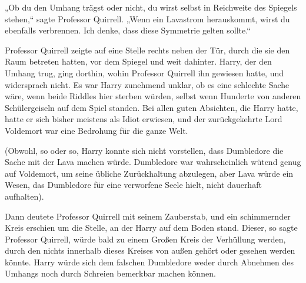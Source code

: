„Ob du den Umhang trägst oder nicht, du wirst selbst in Reichweite des Spiegels stehen,“ sagte Professor Quirrell. „Wenn ein Lavastrom herauskommt, wirst du ebenfalls verbrennen. Ich denke, dass diese Symmetrie gelten sollte.“

Professor Quirrell zeigte auf eine Stelle rechts neben der Tür, durch die sie den Raum betreten hatten, vor dem Spiegel und weit dahinter.
Harry, der den Umhang trug, ging dorthin, wohin Professor Quirrell ihn gewiesen hatte, und widersprach nicht. Es war Harry zunehmend unklar, ob es eine schlechte Sache wäre, wenn beide Riddles hier sterben würden, selbst wenn Hunderte von anderen Schülergeiseln auf dem Spiel standen. Bei allen guten Absichten, die Harry hatte, hatte er sich bisher meistens als Idiot erwiesen, und der zurückgekehrte Lord Voldemort war eine Bedrohung für die ganze Welt.

(Obwohl, so oder so, Harry konnte sich nicht vorstellen, dass Dumbledore die Sache mit der Lava machen würde. Dumbledore war wahrscheinlich wütend genug auf Voldemort, um seine übliche Zurückhaltung abzulegen, aber Lava würde ein Wesen, das Dumbledore für eine verworfene Seele hielt, nicht dauerhaft aufhalten).

Dann deutete Professor Quirrell mit seinem Zauberstab, und ein schimmernder Kreis erschien um die Stelle, an der Harry auf dem Boden stand. Dieser, so sagte Professor Quirrell, würde bald zu einem Großen Kreis der Verhüllung werden, durch den nichts innerhalb dieses Kreises von außen gehört oder gesehen werden könnte. Harry würde sich dem falschen Dumbledore weder durch Abnehmen des Umhangs noch durch Schreien bemerkbar machen können.

